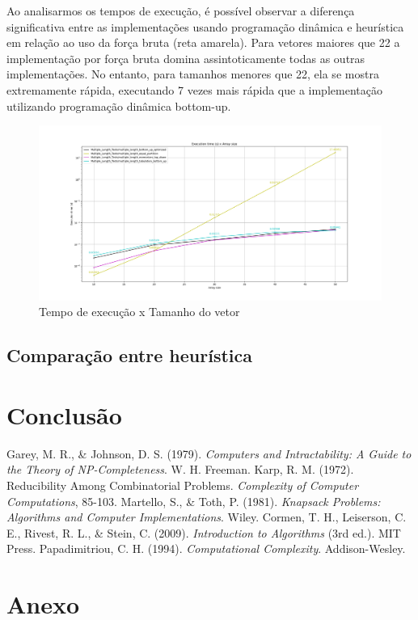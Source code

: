 \documentclass{article}
\begin{document}
Ao analisarmos os tempos de execução, é possível observar a diferença significativa entre as implementações usando programação dinâmica e heurística em relação ao uso da força bruta (reta amarela). Para vetores maiores que 22 a implementação por força bruta domina assintoticamente todas as outras implementações. No entanto, para tamanhos menores que 22, ela se mostra extremamente rápida, executando 7 vezes mais rápida que a implementação utilizando programação dinâmica bottom-up.

\begin{figure} [H]
    \centering
    \caption{Tempo de execução x Tamanho do vetor}
    \includegraphics[width=1\textwidth]{images/multiple_length_tabulation_bottom_up}
\end{figure}

\subsection{Comparação entre heurística}


\section{Conclusão}




\begin{thebibliography}{99}
 Garey, M. R., \& Johnson, D. S. (1979). \textit{Computers and Intractability: A Guide to the Theory of NP-Completeness}. W. H. Freeman.
 Karp, R. M. (1972). Reducibility Among Combinatorial Problems. \textit{Complexity of Computer Computations}, 85-103.
 Martello, S., \& Toth, P. (1981). \textit{Knapsack Problems: Algorithms and Computer Implementations}. Wiley.
 Cormen, T. H., Leiserson, C. E., Rivest, R. L., \& Stein, C. (2009). \textit{Introduction to Algorithms} (3rd ed.). MIT Press.
 Papadimitriou, C. H. (1994). \textit{Computational Complexity}. Addison-Wesley.
\end{thebibliography}

\section{Anexo}
\end{document}
